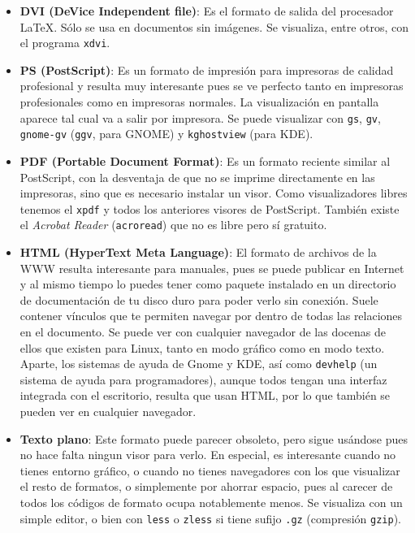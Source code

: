\begin{itemize}

\item {\bf DVI (DeVice Independent file)}: Es el formato de salida del
procesador  \LaTeX.  Sólo  se  usa  en  documentos  sin  imágenes.  Se
visualiza, entre otros, con el programa {\tt xdvi}.

\item  {\bf  PS  (PostScript)}:  Es   un  formato  de  impresión  para
impresoras de  calidad profesional y  resulta muy interesante  pues se
ve  perfecto  tanto en  impresoras  profesionales  como en  impresoras
normales. La visualización en pantalla aparece tal cual va a salir por
impresora. Se puede visualizar con  {\tt gs}, {\tt gv}, {\tt gnome-gv}
({\tt ggv}, para {\sf GNOME}) y {\tt kghostview} (para {\sf KDE}).

\item {\bf  PDF (Portable  Document Format)}:  Es un  formato reciente
similar  al  PostScript,  con  la  desventaja de  que  no  se  imprime
directamente  en las  impresoras, sino  que es  necesario instalar  un
visor. Como  visualizadores libres tenemos  el {\tt xpdf} y  todos los
anteriores  visores  de PostScript.  También  existe  el {\em  Acrobat
Reader} ({\tt acroread}) que no es libre pero sí gratuito.

\item {\bf HTML (HyperText Meta  Language)}: El formato de archivos de
la WWW  resulta interesante para  manuales, pues se puede  publicar en
Internet y al  mismo tiempo lo puedes tener como  paquete instalado en
un directorio de  documentación de tu disco duro para  poder verlo sin
conexión. Suele contener  vínculos que te permiten  navegar por dentro
de todas  las relaciones en el  documento. Se puede ver  con cualquier
navegador de  las docenas de  ellos que  existen para Linux,  tanto en
modo gráfico  como en  modo texto.  Aparte, los  sistemas de  ayuda de
Gnome y  {\sf KDE}, así como  {\tt devhelp} (un sistema  de ayuda para
programadores),  aunque todos  tengan  una interfaz  integrada con  el
escritorio, resulta que usan HTML, por lo que también se pueden ver en
cualquier navegador.

\item {\bf  Texto plano}:  Este formato  puede parecer  obsoleto, pero
sigue  usándose  pues  no  hace  falta ningun  visor  para  verlo.  En
especial, es interesante cuando no tienes entorno gráfico, o cuando no
tienes  navegadores con  los que  visualizar el  resto de  formatos, o
simplemente por ahorrar espacio, pues  al carecer de todos los códigos
de  formato  ocupa notablemente  menos.  Se  visualiza con  un  simple
editor, o bien con {\tt less} o  {\tt zless} si tiene sufijo {\tt .gz}
(compresión {\tt gzip}).

\end{itemize}

